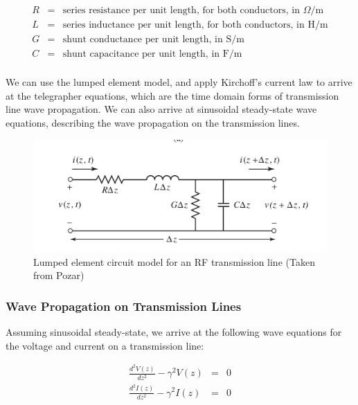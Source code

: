 \documentclass[12pt,onecolumn,titlepage]{article}
\begin{document}
\begin{eqnarray*}
R &=& {\text{series resistance per unit length, for both conductors, in }} \Omega/\text{m} \\
L &=& {\text{series inductance per unit length, for both conductors, in H/m}} \\
G &=& {\text{shunt conductance per unit length, in S/m}} \\
C &=& {\text{shunt capacitance per unit length, in F/m}} \\
\end{eqnarray*}

We can use the lumped element model, and apply Kirchoff's current law to arrive at the telegrapher equations, which are the time domain forms of transmission line wave propagation. We can also arrive at sinusoidal steady-state wave equations, describing the wave propagation on the transmission lines.


\begin{figure}[htbp]
	\centering
	\includegraphics[width=\textwidth]{Pictures/27May2013/Tx_line_circuit_model}
	\caption{ Lumped element circuit model for an RF transmission line (Taken from Pozar)} 
	\label{fig:Tx_line_circuit_model}
\end{figure}



\subsubsection{Wave Propagation on Transmission Lines}
\indent \indent Assuming sinusoidal steady-state, we arrive at the following wave equations for the voltage and current on a transmission line:

\begin{eqnarray}
\frac{d^2 V(z)}{dz^2} - \gamma^2 V(z) &=& 0 \\
\frac{d^2 I(z)}{dz^2} - \gamma^2 I(z) &=& 0\\
\end{eqnarray}
\end{document}
